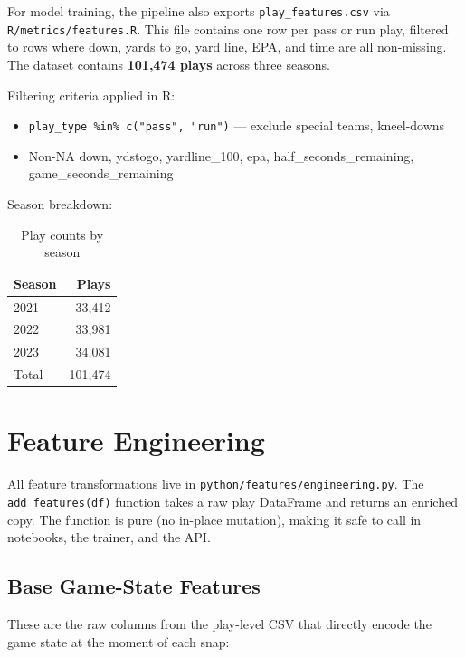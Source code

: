 \documentclass[11pt]{article}
\begin{document}
For model training, the pipeline also exports \texttt{play\_features.csv} via
\texttt{R/metrics/features.R}. This file contains one row per pass or run play,
filtered to rows where down, yards to go, yard line, EPA, and time are all
non-missing. The dataset contains \textbf{101,474 plays} across three seasons.

Filtering criteria applied in R:
\begin{itemize}[noitemsep]
  \item \texttt{play\_type \%in\% c("pass", "run")} --- exclude special teams, kneel-downs
  \item Non-NA down, ydstogo, yardline\_100, epa, half\_seconds\_remaining, game\_seconds\_remaining
\end{itemize}

Season breakdown:
\begin{table}[H]
\centering
\caption{Play counts by season}
\begin{tabular}{lr}
\toprule
Season & Plays \\
\midrule
2021 & 33,412 \\
2022 & 33,981 \\
2023 & 34,081 \\
\midrule
Total & 101,474 \\
\bottomrule
\end{tabular}
\end{table}

\section{Feature Engineering}
\label{sec:features}

All feature transformations live in \texttt{python/features/engineering.py}.
The \texttt{add\_features(df)} function takes a raw play DataFrame and returns
an enriched copy. The function is pure (no in-place mutation), making it safe
to call in notebooks, the trainer, and the API.

\subsection{Base Game-State Features}

These are the raw columns from the play-level CSV that directly encode the game
state at the moment of each snap:
\end{document}

